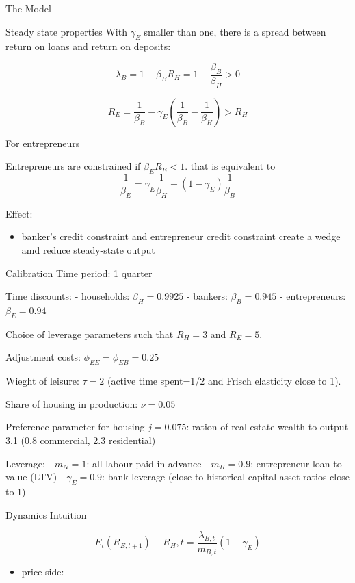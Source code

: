 \documentclass[
  ignorenonframetext,
]{beamer}
\providecommand{\tightlist}{%
  \setlength{\itemsep}{0pt}\setlength{\parskip}{0pt}}\usepackage{longtable,booktabs,array}
\begin{document}
\begin{frame}{The Model}
\begin{block}{Steady state properties}
With \(\gamma_{E}\) smaller than one, there is a spread between return
on loans and return on deposits:

\[\lambda_B = 1-\beta_B R_H = 1-\frac{\beta_B}{\beta_H}>0\]

\[R_E = \frac{1}{\beta_B} - \gamma_E \left( \frac{1}{\beta_B} - \frac{1}{\beta_H} \right)>R_H\]

For entrepreneurs

Entrepreneurs are constrained if \(\beta_E R_E<1\). that is equivalent
to
\[\frac{1}{\beta_E}=\gamma_E \frac{1}{\beta_H} + (1-\gamma_E) \frac{1}{\beta_B}\]

Effect:

\begin{itemize}
\tightlist
\item
  banker's credit constraint and entrepreneur credit constraint create a
  wedge amd reduce steady-state output
\end{itemize}
\end{block}

\begin{block}{Calibration}
\label{calibration}
Time period: 1 quarter

Time discounts: - households: \(\beta_H=0.9925\) - bankers:
\(\beta_B=0.945\) - entrepreneurs: \(\beta_E=0.94\)

Choice of leverage parameters such that \(R_H=3%
\) and \(R_E=5%
\).

Adjustment costs: \(\phi_{EE}=\phi_{EB}=0.25\)

Wieght of leisure: \(\tau=2\) (active time spent=1/2 and Frisch
elasticity close to 1).

Share of housing in production: \(\nu=0.05\)

Preference parameter for housing \(j=0.075\): ration of real estate
wealth to output 3.1 (0.8 commercial, 2.3 residential)

Leverage: - \(m_N=1\): all labour paid in advance - \(m_H=0.9\):
entrepreneur loan-to-value (LTV) - \(\gamma_E=0.9\): bank leverage
(close to historical capital asset ratios close to 1)
\end{block}

\begin{block}{Dynamics}
\label{dynamics}
Intuition

\[E_t \left( R_{E,t+1} \right) - R_H,t = \frac{\lambda_{B,t}}{m_{B,t}}(1-\gamma_E)\]

\begin{itemize}
\tightlist
\item
  price side:
\end{itemize}


\end{block}
\end{frame}
\end{document}
